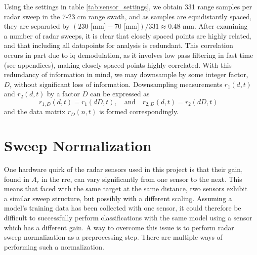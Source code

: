 
Using the settings in table \ref{tab:sensor_settings}, we obtain 331 range samples per radar sweep in the 7-23 cm range swath, and as samples are equidistantly spaced, they are separated by $(230 \text{ [mm]}-70\text{ [mm]})/331\approx0.48$ mm. After examining a number of radar sweeps, it is clear that closely spaced points are highly related, and that including all datapoints for analysis is redundant. This correlation occurs in part due to \gls{iq} demodulation, as it involves low pass filtering in fast time (see appendices), making closely spaced points highly correlated. With this redundancy of information in mind, we may downsample by some integer factor, $D$, without significant loss of information. Downsampling measurements $r_1(d,t)$ and $r_2(d,t)$ by a factor $D$ can be expressed as
\begin{equation}
	\label{eq:downsamp}
	r_{1,D}(d, t) = r_{1}(dD,t),
	\quad \text{and} \quad r_{2,D}(d,t) = r_{2}(dD,t)
\end{equation}
and the data matrix $r_D(n,t)$ is formed correspondingly.

\section{Sweep Normalization}\label{sec:norm}

One hardware quirk of the radar sensors used in this project is that their gain, found in $A_r$ in the \gls{rre}, can vary significantly from one sensor to the next. This means that faced with the same target at the same distance, two sensors exhibit a similar sweep structure, but possibly with a different scaling. Assuming a model's training data has been collected with one sensor, it could therefore be difficult to successfully perform classifications with the same model using a sensor which has a different gain. A way to overcome this issue is to perform radar sweep normalization as a preprocessing step. There are multiple ways of performing such a normalization. %

